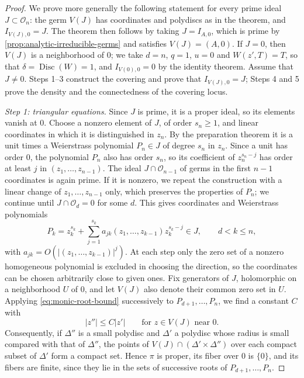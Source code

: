 \begin{proof}
We prove more generally the following statement for every prime ideal $J\subset\mathcal O_n$: the germ $V(J)$ has coordinates and polydiscs as in the theorem, and $I_{V(J),0}=J$. The theorem then follows by taking $J=I_{A,0}$, which is prime by \cref{prop:analytic-irreducible-germs} and satisfies $V(J)=(A,0)$. If $J=0$, then $V(J)$ is a neighborhood of $0$; we take $d=n$, $q=1$, $u=0$ and $W(z',T)=T$, so that $\delta=\operatorname{Disc}(W)=1$, and $I_{V(0),0}=0$ by the identity theorem. Assume that $J\neq0$. Steps 1--3 construct the covering and prove that $I_{V(J),0}=J$; Steps 4 and 5 prove the density and the connectedness of the covering locus.

\emph{Step 1: triangular equations.} Since $J$ is prime, it is a proper ideal, so its elements vanish at $0$. Choose a nonzero element of $J$, of order $s_n\geq1$, and linear coordinates in which it is distinguished in $z_n$. By the preparation theorem it is a unit times a Weierstrass polynomial $P_n\in J$ of degree $s_n$ in $z_n$. Since a unit has order $0$, the polynomial $P_n$ also has order $s_n$, so its coefficient of $z_n^{s_n-j}$ has order at least $j$ in $(z_1,\ldots,z_{n-1})$. The ideal $J\cap\mathcal O_{n-1}$ of germs in the first $n-1$ coordinates is again prime. If it is nonzero, we repeat the construction with a linear change of $z_1,\ldots,z_{n-1}$ only, which preserves the properties of $P_n$; we continue until $J\cap\mathcal O_d=0$ for some $d$. This gives coordinates and Weierstrass polynomials
\[
 P_k=z_k^{s_k}+\sum_{j=1}^{s_k}a_{jk}(z_1,\ldots,z_{k-1})z_k^{s_k-j}\in J,
 \qquad d<k\leq n,
\]
with $a_{jk}=O(|(z_1,\ldots,z_{k-1})|^j)$.
At each step only the zero set of a nonzero homogeneous polynomial is excluded in choosing the direction, so the coordinates can be chosen arbitrarily close to given ones. Fix generators of $J$, holomorphic on a neighborhood $U$ of $0$, and let $V(J)$ also denote their common zero set in $U$. Applying \eqref{eq:monic-root-bound} successively to $P_{d+1},\ldots,P_n$, we find a constant $C$ with
\[
 |z''|\leq C|z'|\qquad\text{for } z\in V(J) \text{ near } 0.
\]
Consequently, if $\Delta''$ is a small polydisc and $\Delta'$ a polydisc whose radius is small compared with that of $\Delta''$, the points of $V(J)\cap(\Delta'\times\Delta'')$ over each compact subset of $\Delta'$ form a compact set. Hence $\pi$ is proper, its fiber over $0$ is $\{0\}$, and its fibers are finite, since they lie in the sets of successive roots of $P_{d+1},\ldots,P_n$.


\end{proof}
